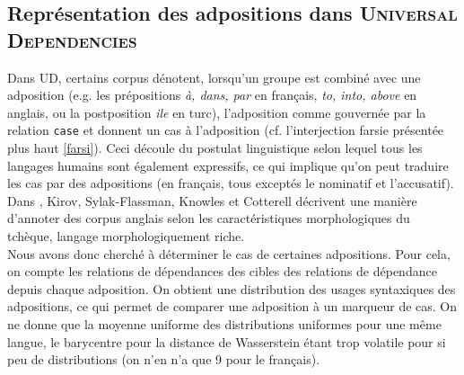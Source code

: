\documentclass{cours}
\begin{document}
\subsection{Représentation des adpositions dans \textsc{Universal Dependencies}}\label{subsec:adpos}
Dans UD, certains corpus dénotent, lorsqu'un groupe est combiné avec une adposition (e.g. les prépositions \textsl{à, dans, par} en français, \textsl{to, into, above} en anglais, ou la postposition \textsl{ile} en turc), l'adposition comme gouvernée par la relation \texttt{case} et donnent un cas à l'adposition (cf. l'interjection farsie présentée plus haut \ref{farsi}).
Ceci découle du postulat linguistique selon lequel tous les langages humains sont également expressifs, ce qui implique qu'on peut traduire les cas par des adpositions (en français, tous exceptés le nominatif et l'accusatif).
Dans \cite{morphenglish}, Kirov, Sylak-Flassman, Knowles et Cotterell décrivent une manière d'annoter des corpus anglais selon les caractéristiques morphologiques du tchèque, langage morphologiquement riche. \\
Nous avons donc cherché à déterminer le cas de certaines adpositions.
Pour cela, on compte les relations de dépendances des cibles des relations de dépendance depuis chaque adposition.
On obtient une distribution des usages syntaxiques des adpositions, ce qui permet de comparer une adposition à un marqueur de cas.
On ne donne que la moyenne uniforme des distributions uniformes pour une même langue, le barycentre pour la distance de Wasserstein étant trop volatile pour si peu de distributions (on n'en n'a que 9 pour le français).
\end{document}

